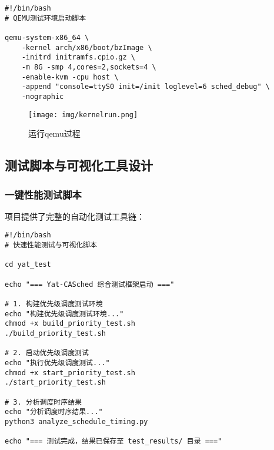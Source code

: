 \begin{tcolorbox} [
    enhanced,
    colback=green!5,
    colframe=green!40!black,
    leftrule=3mm,
    rightrule=0mm,
    toprule=0mm,
    bottomrule=0mm,
    arc=2mm,
    left=5mm,
    right=5mm,
    top=3mm,
    bottom=3mm,
    fonttitle=\bfseries,
    title=\textbf{QEMU启动脚本}
]
\begin{lstlisting}[basicstyle=\footnotesize\fontfamily{zi4}\selectfont, showstringspaces=false]
#!/bin/bash
# QEMU测试环境启动脚本

qemu-system-x86_64 \
    -kernel arch/x86/boot/bzImage \
    -initrd initramfs.cpio.gz \
    -m 8G -smp 4,cores=2,sockets=4 \
    -enable-kvm -cpu host \
    -append "console=ttyS0 init=/init loglevel=6 sched_debug" \
    -nographic
\end{lstlisting}
\end{tcolorbox}
\begin{figure}[H]
\centering

\texttt{[image: img/kernelrun.png]}

\caption{运行qemu过程}
\label{fig:kr}
\end{figure}

\subsection{测试脚本与可视化工具设计}

\subsubsection{一键性能测试脚本}
项目提供了完整的自动化测试工具链：

\begin{tcolorbox} [
    enhanced,
    colback=purple!5,
    colframe=purple!40!black,
    leftrule=3mm,
    rightrule=0mm,
    toprule=0mm,
    bottomrule=0mm,
    arc=2mm,
    left=5mm,
    right=5mm,
    top=3mm,
    bottom=3mm,
    fonttitle=\bfseries,
    title=\textbf{一键性能测试脚本}
]
\begin{lstlisting}[basicstyle=\footnotesize\fontfamily{zi4}\selectfont, showstringspaces=false]
#!/bin/bash
# 快速性能测试与可视化脚本

cd yat_test

echo "=== Yat-CASched 综合测试框架启动 ==="

# 1. 构建优先级调度测试环境
echo "构建优先级调度测试环境..."
chmod +x build_priority_test.sh
./build_priority_test.sh

# 2. 启动优先级调度测试
echo "执行优先级调度测试..."
chmod +x start_priority_test.sh
./start_priority_test.sh

# 3. 分析调度时序结果
echo "分析调度时序结果..."
python3 analyze_schedule_timing.py

echo "=== 测试完成，结果已保存至 test_results/ 目录 ==="
\end{lstlisting}
\end{tcolorbox}

